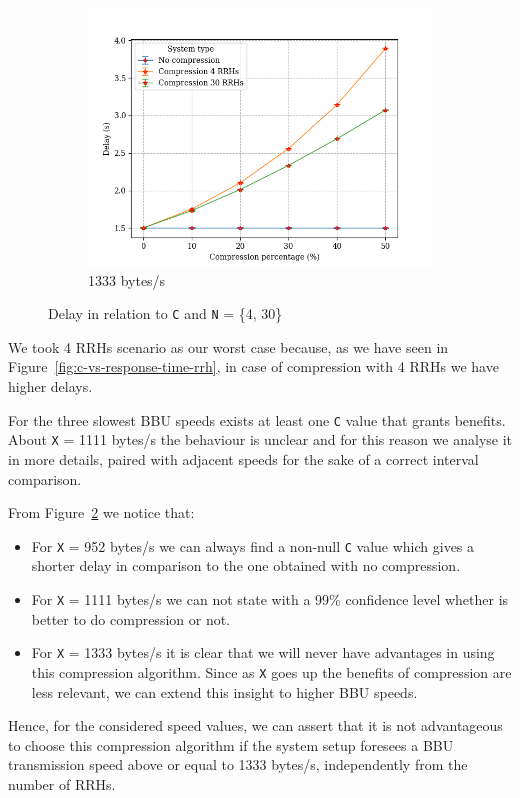 \documentclass[11pt,a4paper,oneside, openright]{article}
\begin{document}
\begin{figure}[H]
\begin{subfigure}{.45\textwidth}
		\includegraphics[width=\linewidth]{images/comp-s-1333}
		\caption{1333 bytes/s}
		\label{fig:comp-s-1333}
	\end{subfigure}
	\caption{Delay in relation to \texttt{C} and \texttt{N} = \{4, 30\}}
	\label{fig:compress-s}
\end{figure}

We took 4 RRHs scenario as our worst case because, as we have seen in Figure~\ref{fig:c-vs-response-time-rrh}, in case of compression with 4 RRHs we have higher delays.

For the three slowest BBU speeds exists at least one \texttt{C} value that grants benefits. About \texttt{X} = 1111 bytes/s the behaviour is unclear and for this reason we analyse it in more details, paired with adjacent speeds for the sake of a correct interval comparison.

From Figure~\ref{fig:compress-s} we notice that:
\begin{itemize}
	\item For \texttt{X} = 952 bytes/s we can always find a non-null \texttt{C} value which gives a shorter delay in comparison to the one obtained with no compression.
	\item For \texttt{X} = 1111 bytes/s we can not state with a 99\% confidence level whether is better to do compression or not.
	\item For \texttt{X} = 1333 bytes/s it is clear that we will never have advantages in using this compression algorithm. Since as \texttt{X} goes up the benefits of compression are less relevant, we can extend this insight to higher BBU speeds. 
\end{itemize}
Hence, for the considered speed values, we can assert that it is not advantageous to choose this compression algorithm if the system setup foresees a BBU transmission speed above or equal to 1333 bytes/s, independently from the number of RRHs.
\end{document}
